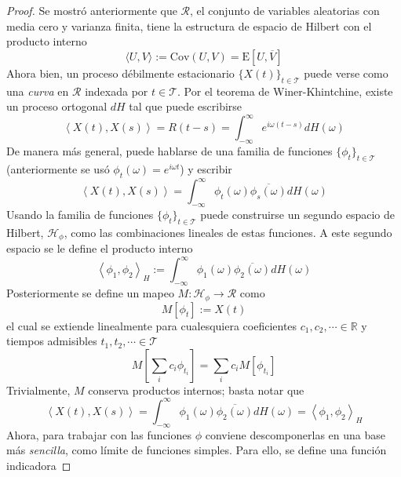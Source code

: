\documentclass[12pt,letterpaper]{book}
\newcommand{\R}{\mathbb{R}}
\newcommand{\intR}{\int_{-\infty}^{\infty}}
\newcommand{\E}[1]{\mathrm{E}\left[ #1 \right]}
\newcommand{\Cov}[1]{\mathrm{Cov}\left( #1 \right)}
\newcommand{\xt}{$\{X(t)\}_{t\in \mathcal{T}}$ }
\newcommand{\pint}[1]{\left\langle #1 \right\rangle}
\begin{document}
\begin{proof}
Se mostró anteriormente que $\mathcal{R}$, el conjunto de variables aleatorias con media cero y varianza finita, tiene la estructura de espacio de Hilbert con el producto interno
\begin{equation}
\langle U , V \rangle := \Cov{U,V} = \E{U, \overline{V}}
\end{equation}
Ahora bien, un proceso débilmente estacionario \xt puede verse como una \textit{curva} en $\mathcal{R}$ indexada por $t \in \mathcal{T}$.
%
Por el teorema de Winer-Khintchine, existe un proceso ortogonal $dH$ tal que puede escribirse
\begin{equation}
\pint{X(t),X(s)} = R(t-s) = \intR e^{i \omega (t-s)} dH(\omega)
\end{equation} 
De manera más general, puede hablarse de una familia de funciones $\{ \phi_t \}_{t\in \mathcal{T}}$ (anteriormente se usó $\phi_t(\omega) = e^{i \omega t}$) y escribir
\begin{equation}
\pint{X(t),X(s)} = \intR \phi_t(\omega) \overline{\phi_s(\omega)} dH(\omega)
\end{equation} 
Usando la familia de funciones $\{ \phi_t \}_{t\in \mathcal{T}}$ puede construirse un segundo espacio de Hilbert, $\mathcal{H}_\phi$, como las combinaciones lineales de estas funciones.
A este segundo espacio se le define el producto interno
\begin{equation}
\pint{\phi_1,\phi_2}_H := \intR \phi_1(\omega) \overline{\phi_2(\omega)} dH(\omega)
\end{equation} 
Posteriormente se define un mapeo $M : \mathcal{H}_\phi \rightarrow \mathcal{R}$ como
\begin{equation}
M[\phi_t] := X(t)
\end{equation}
el cual se extiende linealmente para cualesquiera coeficientes $c_1, c_2, \cdots \in \R$ y tiempos admisibles $t_1, t_2, \cdots \in \mathcal{T}$
\begin{equation}
M\left[ \sum_i c_i \phi_{t_i} \right] = \sum_i c_i M\left[ \phi_{t_i} \right]
\end{equation}
Trivialmente, $M$ conserva productos internos; basta notar que
\begin{equation}
\pint{X(t),X(s)} = \intR \phi_1(\omega) \overline{\phi_2(\omega)} dH(\omega) = \pint{\phi_1,\phi_2}_H
\end{equation}
Ahora, para trabajar con las funciones $\phi$ conviene descomponerlas en una base más \textit{sencilla}, como límite de funciones simples. Para ello, se define una función indicadora

\end{proof}
\end{document}

